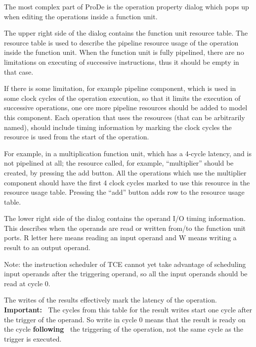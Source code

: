 \documentclass[twoside]{tceusermanual}
\begin{document}
The most complex part of ProDe is the operation property dialog which pops
up when editing the operations inside a function unit.


The upper right side of the dialog contains the function unit resource table.
The resource table is used to describe the pipeline resource usage of the
operation inside the function unit.
When the function unit is fully pipelined, there are no limitations on
executing of successive instructions, thus it should be empty in that case.

If there is some limitation, for example pipeline component, which is used in 
some clock cycles of the operation execution, so that it limits the execution of 
successive operations, one ore more pipeline resources should be added to model 
this component. Each operation that uses the resources (that can be arbitrarily
named), should include timing information by marking the clock cycles the resource
is used from the start of the operation.

For example, in a multiplication function unit, which has a 4-cycle latency,
and is not pipelined at all; the resource called, for example, ``multiplier'' 
should be created, by pressing the add button. All the operations which use the 
multiplier component should have the first 4 clock cycles marked to use this 
resource in the resource usage table. Pressing the ``add'' button adds row to 
the resource usage table.

The lower right side of the dialog contains the operand I/O timing information.
This describes when the operands are read or written from/to the function unit
ports. R letter here means reading an input operand and W means writing a result to 
an output operand.

Note: the instruction scheduler of TCE cannot yet take advantage of scheduling 
input operands after the triggering operand, so all the input operands should be 
read at cycle 0.


The writes of the results effectively mark the latency of the operation.
\textbf{Important:\ }
The cycles from this table for the result writes start one cycle after the
trigger of the operand. So write in cycle 0 means that the result is ready
on the cycle \textbf{following\ } the triggering of the operation, 
not the same cycle as the trigger is executed.
\end{document}
